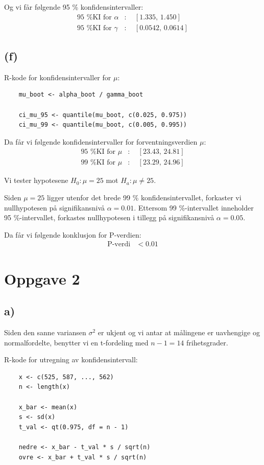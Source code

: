 \documentclass[11pt, a4paper]{article}
\begin{document}
Og vi får følgende 95 \% konfidensintervaller:
\begin{align*}
    \text{95 \% KI for } \alpha &: \quad [1.335, \, 1.450] \\
    \text{95 \% KI for } \gamma &: \quad [0.0542, \, 0.0614]
\end{align*}


\subsection*{(f)}
R-kode for konfidensintervaller for $\mu$:
\begin{verbatim}
    mu_boot <- alpha_boot / gamma_boot

    ci_mu_95 <- quantile(mu_boot, c(0.025, 0.975))
    ci_mu_99 <- quantile(mu_boot, c(0.005, 0.995))
\end{verbatim}

Da får vi følgende konfidensintervaller for forventningsverdien $\mu$:
\begin{align*}
    \text{95 \% KI for } \mu &: \quad [23.43, \, 24.81] \\
    \text{99 \% KI for } \mu &: \quad [23.29, \, 24.96]
\end{align*}

Vi tester hypotesene $H_0: \mu = 25$ mot $H_a: \mu \neq 25$. 

Siden $\mu = 25$ ligger utenfor det brede 99 \% konfidensintervallet, forkaster vi nullhypotesen på signifikansnivå $\alpha = 0.01$. Ettersom 99 \%-intervallet inneholder 95 \%-intervallet, forkastes nullhypotesen i tillegg på signifikansnivå $\alpha = 0.05$.

Da får vi følgende konklusjon for P-verdien:
\begin{align*}
    \text{P-verdi} &< 0.01
\end{align*}

\newpage
\section*{Oppgave 2}

\subsection*{a)}

Siden den sanne variansen $\sigma^2$ er ukjent og vi antar at målingene er uavhengige og normalfordelte, benytter vi en t-fordeling med $n-1 = 14$ frihetsgrader. 

R-kode for utregning av konfidensintervall:
\begin{verbatim}
    x <- c(525, 587, ..., 562)
    n <- length(x)

    x_bar <- mean(x)
    s <- sd(x)
    t_val <- qt(0.975, df = n - 1)

    nedre <- x_bar - t_val * s / sqrt(n)
    ovre <- x_bar + t_val * s / sqrt(n)
\end{verbatim}
\end{document}
